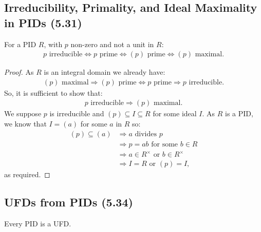 \subsection{Irreducibility, Primality, and Ideal Maximality in PIDs (5.31)} \label{5.31}

For a PID $R$, with $p$ non-zero and not a unit in $R$: \begin{align*}
    p \text{ irreducible} 
    \Longleftrightarrow p \text{ prime}
    \Longleftrightarrow (p) \text{ prime}
    \Longleftrightarrow (p) \text{ maximal}.
\end{align*}

\begin{proof}
    As $R$ is an integral domain we already have: \begin{align*}
        (p) \text{ maximal}
        \Longrightarrow (p) \text{ prime}
        \Longleftrightarrow p \text{ prime}
        \Longrightarrow p \text{ irreducible}.
    \end{align*} So, it is sufficient to show that: \begin{align*}
        p \text{ irreducible} \Longrightarrow (p) \text{ maximal}.
    \end{align*} We suppose $p$ is irreducible and $(p) \subseteq I \subseteq R$
    for some ideal $I$. As $R$ is a PID, we know that $I = (a)$ for some $a$ in
    $R$ so: \begin{align*}
        (p) \subseteq (a) 
        &\Longrightarrow a \text{ divides } p \\
        &\Longrightarrow p = ab \text{ for some } b \in R \\
        &\Longrightarrow a \in R^\times \text{ or } b \in R^\times \tag{$p$ irreducible} \\
        &\Longrightarrow I = R \text{ or } (p) = I,
    \end{align*} as required.
\end{proof}

\subsection{UFDs from PIDs (5.34)} \label{5.34}

Every PID is a UFD.

